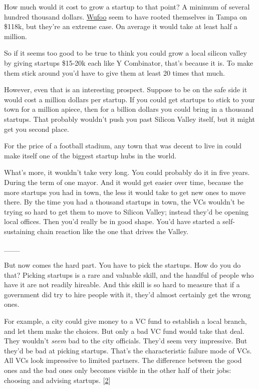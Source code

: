 How much would it cost to grow a startup to that point? A minimum of
several hundred thousand dollars. \href{http://wufoo.com}{Wufoo} seem to
have rooted themselves in Tampa on \$118k, but they're an extreme case.
On average it would take at least half a million.

So if it seems too good to be true to think you could grow a local
silicon valley by giving startups \$15-20k each like Y Combinator,
that's because it is. To make them stick around you'd have to give them
at least 20 times that much.

However, even that is an interesting prospect. Suppose to be on the safe
side it would cost a million dollars per startup. If you could get
startups to stick to your town for a million apiece, then for a billion
dollars you could bring in a thousand startups. That probably wouldn't
push you past Silicon Valley itself, but it might get you second place.

For the price of a football stadium, any town that was decent to live in
could make itself one of the biggest startup hubs in the world.

What's more, it wouldn't take very long. You could probably do it in
five years. During the term of one mayor. And it would get easier over
time, because the more startups you had in town, the less it would take
to get new ones to move there. By the time you had a thousand startups
in town, the VCs wouldn't be trying so hard to get them to move to
Silicon Valley; instead they'd be opening local offices. Then you'd
really be in good shape. You'd have started a self-sustaining chain
reaction like the one that drives the Valley.

\_\_\_

But now comes the hard part. You have to pick the startups. How do you
do that? Picking startups is a rare and valuable skill, and the handful
of people who have it are not readily hireable. And this skill is so
hard to measure that if a government did try to hire people with it,
they'd almost certainly get the wrong ones.

For example, a city could give money to a VC fund to establish a local
branch, and let them make the choices. But only a bad VC fund would take
that deal. They wouldn't \emph{seem} bad to the city officials. They'd
seem very impressive. But they'd be bad at picking startups. That's the
characteristic failure mode of VCs. All VCs look impressive to limited
partners. The difference between the good ones and the bad ones only
becomes visible in the other half of their jobs: choosing and advising
startups. {[}\hyperref[f2n]{2}{]}

